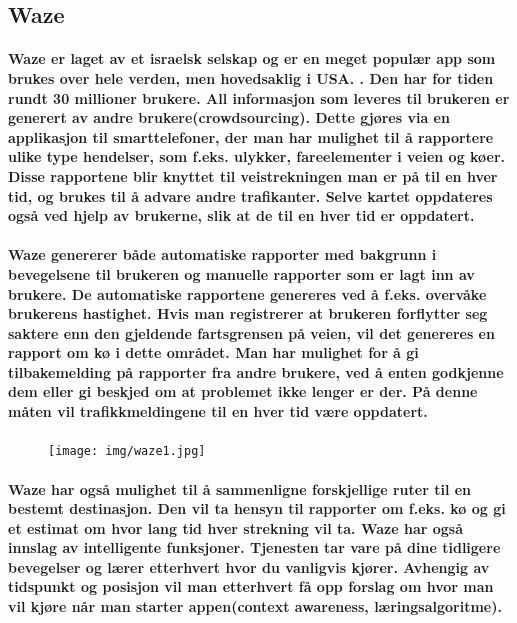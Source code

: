 \subsection{Waze}
\paragraph{Waze er laget av et israelsk selskap og er en meget populær app som brukes over hele verden, men hovedsaklig i USA. . Den har for tiden rundt 30 millioner brukere. All informasjon som leveres til brukeren er generert av andre brukere(crowdsourcing). Dette gjøres via en applikasjon til smarttelefoner, der man har mulighet til å rapportere ulike type hendelser, som f.eks. ulykker, fareelementer i veien og køer. Disse rapportene blir knyttet til veistrekningen man er på til en hver tid, og brukes til å advare andre trafikanter. Selve kartet oppdateres også ved hjelp av brukerne, slik at de til en hver tid er oppdatert.}

\paragraph{Waze genererer både automatiske rapporter med bakgrunn i bevegelsene til brukeren og manuelle rapporter som er lagt inn av brukere. De automatiske rapportene genereres ved å f.eks. overvåke brukerens hastighet. Hvis man registrerer at brukeren forflytter seg saktere enn den gjeldende fartsgrensen på veien, vil det genereres en rapport om kø i dette området. Man har mulighet for å gi tilbakemelding på rapporter fra andre brukere, ved å enten godkjenne dem eller gi beskjed om at problemet ikke lenger er der. På denne måten vil trafikkmeldingene til en hver tid være oppdatert.}

\begin{figure}[p]
\centering
\texttt{[image: img/waze1.jpg]}
\label{fig:waze1}
\end{figure}

\paragraph{Waze har også mulighet til å sammenligne forskjellige ruter til en bestemt destinasjon. Den vil ta hensyn til rapporter om f.eks. kø og gi et estimat om hvor lang tid hver strekning vil ta. Waze har også innslag av intelligente funksjoner. Tjenesten tar vare på dine tidligere bevegelser og lærer etterhvert hvor du vanligvis kjører. Avhengig av tidspunkt og posisjon vil man etterhvert få opp forslag om hvor man vil kjøre når man starter appen(context awareness, læringsalgoritme).}

